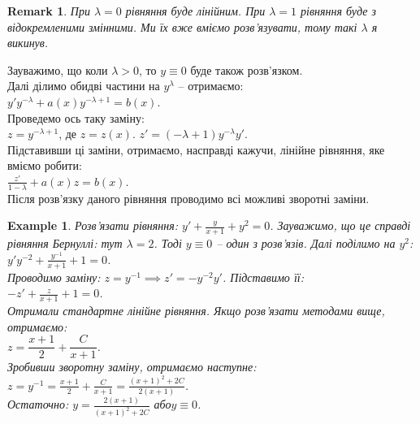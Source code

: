 \documentclass[a4paper, 10pt]{article}
\theoremstyle{theoremdd}
\theoremstyle{theoremdd}
\theoremstyle{theoremdd}
\theoremstyle{theoremdd}
\newtheorem{example}[theorem]{Example}
\theoremstyle{theoremdd}
\theoremstyle{theoremdd}
\newtheorem{remark}[theorem]{Remark}
\theoremstyle{theoremdd}
\theoremstyle{theoremdd}
\begin{document}
	\begin{remark}
	При $\lambda = 0$ рівняння буде лінійним. При $\lambda = 1$ рівняння буде з відокремленими змінними. Ми їх вже вміємо розв'язувати, тому такі $\lambda$ я викинув.
	\end{remark}
	
	Зауважимо, що коли $\lambda > 0$, то $y \equiv 0$ буде також розв'язком. \\
	Далі ділимо обидві частини на $y^{\lambda}$ -- отримаємо:\\
	$\displaystyle y'y^{-\lambda} + a(x)y^{-\lambda+1} = b(x)$.\\
	Проведемо ось таку заміну: \\
	$z = y^{-\lambda+1}$, де $z=z(x)$. $z' = (-\lambda + 1)y^{-\lambda}y'$.\\
	Підставивши ці заміни, отримаємо, насправді кажучи, лінійне рівняння, яке вміємо робити:\\
	$\displaystyle \frac{z'}{1-\lambda} + a(x)z=b(x)$.\\
	Після розв'язку даного рівняння проводимо всі можливі зворотні заміни.
	
	\begin{example}
 Розв'язати рівняння: $\displaystyle y' + \frac{y}{x+1} + y^2 = 0$.
 Зауважимо, що це справді рівняння Бернуллі: тут $\lambda = 2$. Тоді $y \equiv 0$ -- один з розв'язів. Далі поділимо на $y^2$:\\
	$\displaystyle y'y^{-2} + \frac{y^{-1}}{x+1} + 1 = 0$.\\
	Проводимо заміну: $z = y^{-1} \implies z' = -y^{-2}y'$. Підставимо її:\\
	$\displaystyle -z' + \frac{z}{x+1} + 1 = 0$.\\
	Отримали стандартне лінійне рівняння. Якщо розв'язати методами вище, отримаємо:\\
	$z = \dfrac{x+1}{2} + \dfrac{C}{x+1}$.\\
	Зробивши зворотну заміну, отримаємо наступне:\\
$\displaystyle z = y^{-1} = \frac{x+1}{2} + \frac{C}{x+1} = \frac{(x+1)^2+2C}{2(x+1)}$.\\
	Остаточно: $\displaystyle y = \frac{2(x+1)}{(x+1)^2 + 2C}$ або$y \equiv 0$.
	\end{example}

	
\end{document}
